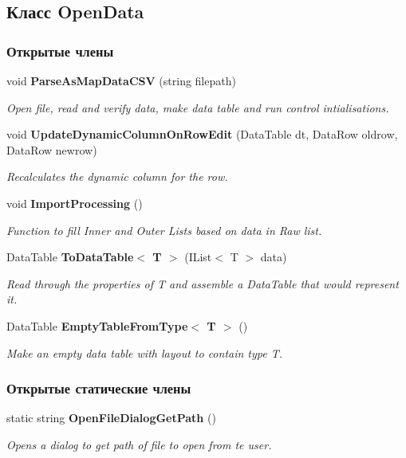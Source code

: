 \subsection{Класс Open\+Data}
\label{classkdz__manager_1_1_open_data}
\subsubsection*{Открытые члены}
\begin{DoxyCompactItemize}
\item 
void {\bf Parse\+As\+Map\+Data\+C\+S\+V} (string filepath)
\begin{DoxyCompactList}\small\item\em Open file, read and verify data, make data table and run control intialisations. \end{DoxyCompactList}\item 
void {\bf Update\+Dynamic\+Column\+On\+Row\+Edit} (Data\+Table dt, Data\+Row oldrow, Data\+Row newrow)
\begin{DoxyCompactList}\small\item\em Recalculates the dynamic column for the row. \end{DoxyCompactList}\item 
void {\bf Import\+Processing} ()
\begin{DoxyCompactList}\small\item\em Function to fill Inner and Outer Lists based on data in Raw list. \end{DoxyCompactList}\item 
Data\+Table {\bf To\+Data\+Table$<$ T $>$} (I\+List$<$ T $>$ data)
\begin{DoxyCompactList}\small\item\em Read through the properties of T and assemble a Data\+Table that would represent it. \end{DoxyCompactList}\item 
Data\+Table {\bf Empty\+Table\+From\+Type$<$ T $>$} ()
\begin{DoxyCompactList}\small\item\em Make an empty data table with layout to contain type T. \end{DoxyCompactList}\end{DoxyCompactItemize}
\subsubsection*{Открытые статические члены}
\begin{DoxyCompactItemize}
\item 
static string {\bf Open\+File\+Dialog\+Get\+Path} ()
\begin{DoxyCompactList}\small\item\em Opens a dialog to get path of file to open from te user. \end{DoxyCompactList}\end{DoxyCompactItemize}
